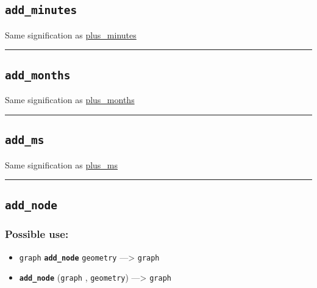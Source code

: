 \documentclass[]{book}
\providecommand{\tightlist}{%
  \setlength{\itemsep}{0pt}\setlength{\parskip}{0pt}}
\theoremstyle{definition}
\theoremstyle{definition}
\theoremstyle{definition}
\theoremstyle{remark}
\begin{document}
\subsection{\texorpdfstring{\texttt{add\_minutes}}{add\_minutes}}\label{add_minutes}

Same signification as
\href{operators-n-to-r.html\#plus_minutes}{plus\_minutes}

\begin{center}\rule{0.5\linewidth}{\linethickness}\end{center}

\subsection{\texorpdfstring{\texttt{add\_months}}{add\_months}}\label{add_months}

Same signification as
\href{operators-n-to-r.html\#plus_months}{plus\_months}

\begin{center}\rule{0.5\linewidth}{\linethickness}\end{center}

\subsection{\texorpdfstring{\texttt{add\_ms}}{add\_ms}}\label{add_ms}

Same signification as \href{operators-n-to-r.html\#plus_ms}{plus\_ms}

\begin{center}\rule{0.5\linewidth}{\linethickness}\end{center}

\subsection{\texorpdfstring{\texttt{add\_node}}{add\_node}}\label{add_node}

\subsubsection{Possible use:}\label{possible-use-21}

\begin{itemize}
\tightlist
\item
  \texttt{graph} \textbf{\texttt{add\_node}} \texttt{geometry}
  ---\textgreater{} \texttt{graph}
\item
  \textbf{\texttt{add\_node}} (\texttt{graph} , \texttt{geometry})
  ---\textgreater{} \texttt{graph}
\end{itemize}
\end{document}
